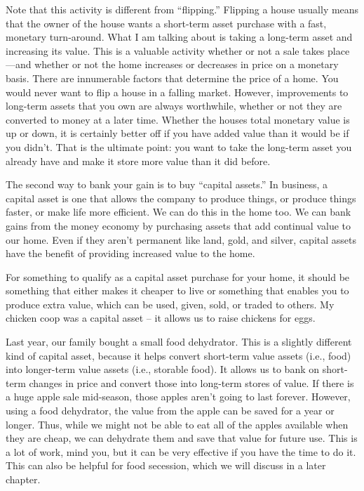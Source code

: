 Note that this activity is different from “flipping.”  Flipping a house
usually means that the owner of the house wants a short-term asset
purchase with a fast, monetary turn-around. What I am talking about is
taking a long-term asset and increasing its value. This is a valuable
activity whether or not a sale takes place—and whether or not the home
increases or decreases in price on a monetary basis. There are
innumerable factors that determine the price of a home. You would never
want to flip a house in a falling market. However, improvements to
long-term assets that you own are always worthwhile, whether or not
they are converted to money at a later time. Whether the
house{\textquotesingle}s total monetary value is up or down, it is
certainly better off if you have added value than it would be if you
didn’t. That is the ultimate point: you want to take the long-term
asset you already have and make it store more value than it did
before.

The second way to bank your gain is to buy “capital assets.”  In
business, a capital asset is one that allows the company to produce
things, or produce things faster, or make life more efficient. We can
do this in the home too. We can bank gains from the money economy by
purchasing assets that add continual value to our home. Even if they
aren’t permanent like land, gold, and silver, capital assets have the
benefit of providing increased value to the home. 

For something to qualify as a capital asset purchase for your home, it
should be something that either makes it cheaper to live or something
that enables you to produce extra value, which can be used, given,
sold, or traded to others. My chicken coop was a capital asset – it
allows us to raise chickens for eggs. 

Last year, our family bought a small food dehydrator. This is a slightly
different kind of capital asset, because it helps convert short-term
value assets (i.e., food) into longer-term value assets (i.e., storable
food). It allows us to bank on short-term changes in price and convert
those into long-term stores of value. If there is a huge apple sale
mid-season, those apples aren’t going to last forever. However, using a
food dehydrator, the value from the apple can be saved for a year or
longer. Thus, while we might not be able to eat all of the apples
available when they are cheap, we can dehydrate them and save that
value for future use. This is a lot of work, mind you, but it can be
very effective if you have the time to do it. This can also be helpful
for food secession, which we will discuss in a later chapter.


